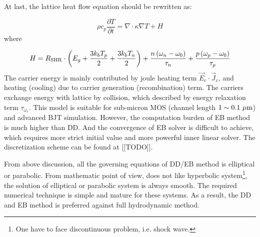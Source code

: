 \documentclass[oneside,12pt]{cgd_book}
\begin{document}
At last, the lattice heat flow equation should be rewritten as:
\par
\par
\begin{equation}
\rho c_p \frac{\partial T}{\partial t} = \nabla \cdot \kappa \nabla T + H
\end{equation}
where
\par
\begin{equation}
H = R_{\rm SHR} \cdot \left( E_g + \frac{3k_b T_p } {2} + \frac{3k_b T_n } {2} \right) + \frac{
        n\left( \omega _n - \omega _0 \right)} {\tau _n } + \frac{p\left( \omega _p - \omega _0 \right)}{\tau _p
        }
\end{equation}
The carrier energy is mainly contributed by joule heating term $\vec{E}_c\cdot
      \vec{J}_c$, and heating (cooling) due to carrier generation (recombination) term. The carriers exchange
      energy with lattice by collision, which described by energy relaxation term
$\tau_{\omega
      _c}$. This model is suitable for sub-micron MOS (channel length
$1\sim 0.1
      ~\mu \rm m$) and advanced BJT simulation. However, the computation burden of EB method is much higher than
      DD. And the convergence of EB solver is difficult to achieve, which requires more strict initial value and more
      powerful inner linear solver. The discretization scheme can be found at [[TODO]].
\par
From above discussion, all the governing equations of DD/EB method is elliptical or parabolic. From
      mathematic point of view, does not like hyperbolic system\footnote{One have to face discontinuous problem, i.e. shock wave.}, the solution of elliptical or parabolic system is always smooth. The required numerical technique
      is simple and mature for these systems. As a result, the DD and EB method is preferred against full hydrodynamic
      method.
\par
\end{document}
